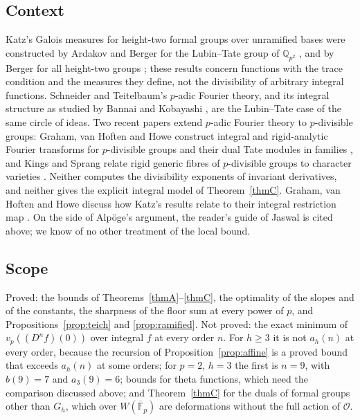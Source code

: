 \documentclass[11pt]{amsart}
\theoremstyle{definition}
\theoremstyle{remark}
\newcommand{\Q}{\mathbb Q}
\newcommand{\F}{\mathbb F}
\newcommand{\vp}{v_p}
\begin{document}
\subsection{Context}
Katz's Galois measures for height-two formal groups over unramified bases were constructed by Ardakov and Berger for the Lubin--Tate group of $\Q_{p^2}$ \cite{AB24}, and by Berger for all height-two groups \cite{Berger25}; these results concern functions with the trace condition and the measures they define, not the divisibility of arbitrary integral functions. Schneider and Teitelbaum's $p$-adic Fourier theory, and its integral structure as studied by Bannai and Kobayashi \cite{BK16}, are the Lubin--Tate case of the same circle of ideas. Two recent papers extend $p$-adic Fourier theory to $p$-divisible groups: Graham, van Hoften and Howe construct integral and rigid-analytic Fourier transforms for $p$-divisible groups and their dual Tate modules in families \cite[Theorems 7.0.2 and 7.2.6]{GHH25}, and Kings and Sprang relate rigid generic fibres of $p$-divisible groups to character varieties \cite[Theorem 7.1]{KS26}. Neither computes the divisibility exponents of invariant derivatives, and neither gives the explicit integral model of Theorem~\ref{thmC}. Graham, van Hoften and Howe discuss how Katz's results relate to their integral restriction map \cite[Remark 7.2.4]{GHH25}. On the side of Alp\"oge's argument, the reader's guide of Jaswal \cite{Jaswal} is cited above; we know of no other treatment of the local bound.

\subsection{Scope}
Proved: the bounds of Theorems~\ref{thmA}--\ref{thmC}, the optimality of the slopes and of the constants, the sharpness of the floor sum at every power of $p$, and Propositions~\ref{prop:teich} and \ref{prop:ramified}. Not proved: the exact minimum of $\vp((D^nf)(0))$ over integral $f$ at every order $n$. For $h\ge3$ it is not $a_h(n)$ at every order, because the recursion of Proposition~\ref{prop:affine} is a proved bound that exceeds $a_h(n)$ at some orders; for $p=2$, $h=3$ the first is $n=9$, with $b(9)=7$ and $a_3(9)=6$; bounds for theta functions, which need the comparison discussed above; and Theorem~\ref{thmC} for the duals of formal groups other than $G_h$, which over $W(\overline{\F}_p)$ are deformations without the full action of $\mathcal O$.
\end{document}
